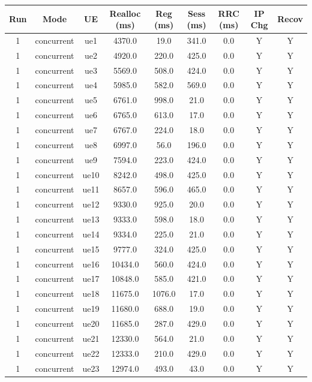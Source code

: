 \begin{table}[ht]
\centering
\begin{tabular}{|c|c|c|c|c|c|c|c|c|}
\hline
Run & Mode & UE & Realloc (ms) & Reg (ms) & Sess (ms) & RRC (ms) & IP Chg & Recov \\
\hline
1 & concurrent & ue1 & 4370.0 & 19.0 & 341.0 & 0.0 & Y & Y \\
1 & concurrent & ue2 & 4920.0 & 220.0 & 425.0 & 0.0 & Y & Y \\
1 & concurrent & ue3 & 5569.0 & 508.0 & 424.0 & 0.0 & Y & Y \\
1 & concurrent & ue4 & 5985.0 & 582.0 & 569.0 & 0.0 & Y & Y \\
1 & concurrent & ue5 & 6761.0 & 998.0 & 21.0 & 0.0 & Y & Y \\
1 & concurrent & ue6 & 6765.0 & 613.0 & 17.0 & 0.0 & Y & Y \\
1 & concurrent & ue7 & 6767.0 & 224.0 & 18.0 & 0.0 & Y & Y \\
1 & concurrent & ue8 & 6997.0 & 56.0 & 196.0 & 0.0 & Y & Y \\
1 & concurrent & ue9 & 7594.0 & 223.0 & 424.0 & 0.0 & Y & Y \\
1 & concurrent & ue10 & 8242.0 & 498.0 & 425.0 & 0.0 & Y & Y \\
1 & concurrent & ue11 & 8657.0 & 596.0 & 465.0 & 0.0 & Y & Y \\
1 & concurrent & ue12 & 9330.0 & 925.0 & 20.0 & 0.0 & Y & Y \\
1 & concurrent & ue13 & 9333.0 & 598.0 & 18.0 & 0.0 & Y & Y \\
1 & concurrent & ue14 & 9334.0 & 225.0 & 21.0 & 0.0 & Y & Y \\
1 & concurrent & ue15 & 9777.0 & 324.0 & 425.0 & 0.0 & Y & Y \\
1 & concurrent & ue16 & 10434.0 & 560.0 & 424.0 & 0.0 & Y & Y \\
1 & concurrent & ue17 & 10848.0 & 585.0 & 421.0 & 0.0 & Y & Y \\
1 & concurrent & ue18 & 11675.0 & 1076.0 & 17.0 & 0.0 & Y & Y \\
1 & concurrent & ue19 & 11680.0 & 688.0 & 19.0 & 0.0 & Y & Y \\
1 & concurrent & ue20 & 11685.0 & 287.0 & 429.0 & 0.0 & Y & Y \\
1 & concurrent & ue21 & 12330.0 & 564.0 & 21.0 & 0.0 & Y & Y \\
1 & concurrent & ue22 & 12333.0 & 210.0 & 429.0 & 0.0 & Y & Y \\
1 & concurrent & ue23 & 12974.0 & 493.0 & 43.0 & 0.0 & Y & Y \\

\end{tabular}
\end{table}
